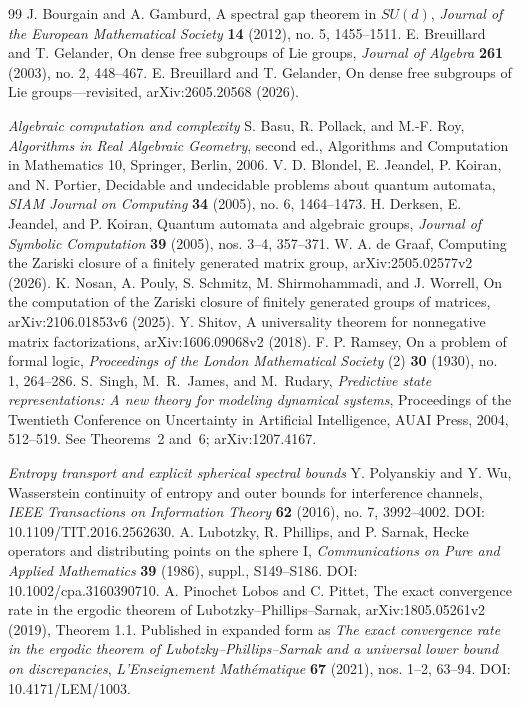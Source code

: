 \begin{thebibliography}{99}
 J. Bourgain and A. Gamburd, A spectral gap theorem in $SU(d)$, \emph{Journal of the European Mathematical Society} \textbf{14} (2012), no. 5, 1455--1511.
 E. Breuillard and T. Gelander, On dense free subgroups of Lie groups, \emph{Journal of Algebra} \textbf{261} (2003), no. 2, 448--467.
 E. Breuillard and T. Gelander, On dense free subgroups of Lie groups---revisited, arXiv:2605.20568 (2026).
\item[]\textit{Algebraic computation and complexity}
 S. Basu, R. Pollack, and M.-F. Roy, \emph{Algorithms in Real Algebraic Geometry}, second ed., Algorithms and Computation in Mathematics 10, Springer, Berlin, 2006.
 V. D. Blondel, E. Jeandel, P. Koiran, and N. Portier, Decidable and undecidable problems about quantum automata, \emph{SIAM Journal on Computing} \textbf{34} (2005), no. 6, 1464--1473.
 H. Derksen, E. Jeandel, and P. Koiran, Quantum automata and algebraic groups, \emph{Journal of Symbolic Computation} \textbf{39} (2005), nos. 3--4, 357--371.
 W. A. de Graaf, Computing the Zariski closure of a finitely generated matrix group, arXiv:2505.02577v2 (2026).
 K. Nosan, A. Pouly, S. Schmitz, M. Shirmohammadi, and J. Worrell, On the computation of the Zariski closure of finitely generated groups of matrices, arXiv:2106.01853v6 (2025).
 Y. Shitov, A universality theorem for nonnegative matrix factorizations, arXiv:1606.09068v2 (2018).
 F. P. Ramsey, On a problem of formal logic, \emph{Proceedings of the London Mathematical Society} (2) \textbf{30} (1930), no. 1, 264--286.
S.~Singh, M.~R.~James, and M.~Rudary,
\emph{Predictive state representations: A new theory for modeling dynamical systems},
Proceedings of the Twentieth Conference on Uncertainty in Artificial Intelligence,
AUAI Press, 2004, 512--519. See Theorems~2 and~6; arXiv:1207.4167.
\item[]\textit{Entropy transport and explicit spherical spectral bounds}
 Y. Polyanskiy and Y. Wu, Wasserstein continuity of entropy and outer bounds for interference channels, \emph{IEEE Transactions on Information Theory} \textbf{62} (2016), no. 7, 3992--4002. DOI: 10.1109/TIT.2016.2562630.
 A. Lubotzky, R. Phillips, and P. Sarnak, Hecke operators and distributing points on the sphere I, \emph{Communications on Pure and Applied Mathematics} \textbf{39} (1986), suppl., S149--S186. DOI: 10.1002/cpa.3160390710.
 A. Pinochet Lobos and C. Pittet, The exact convergence rate in the ergodic theorem of Lubotzky--Phillips--Sarnak, arXiv:1805.05261v2 (2019), Theorem 1.1. Published in expanded form as \emph{The exact convergence rate in the ergodic theorem of Lubotzky--Phillips--Sarnak and a universal lower bound on discrepancies}, \emph{L'Enseignement Math\'ematique} \textbf{67} (2021), nos. 1--2, 63--94. DOI: 10.4171/LEM/1003.
\end{thebibliography}
